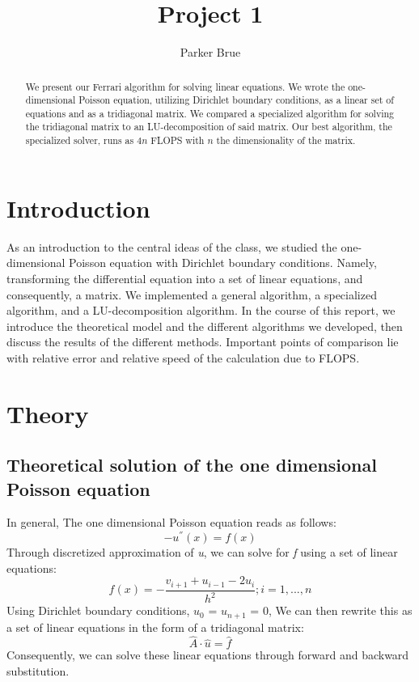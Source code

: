 \documentclass[10pt,showpacs,preprintnumbers,footinbib,amsmath,amssymb,aps,prl,twocolumn,groupedaddress,superscriptaddress,showkeys]{revtex4-1}
\begin{document}
\title{Project 1}
\author{Parker Brue}
\begin{abstract}
We present our Ferrari algorithm for solving linear equations. We wrote the one-dimensional Poisson equation, utilizing Dirichlet boundary conditions, as a linear set of equations and as a tridiagonal matrix. We compared a specialized algorithm for solving the tridiagonal matrix to an LU-decomposition of said matrix.  Our best algorithm, the specialized solver, runs as $4n$ FLOPS with $n$ the dimensionality of the matrix.
\end{abstract}
\maketitle

\section{Introduction}
As an introduction to the central ideas of the class, we studied the one-dimensional Poisson equation with Dirichlet boundary conditions. Namely, transforming the differential equation into a set of linear equations, and consequently, a matrix. We implemented a general algorithm, a specialized algorithm, and a LU-decomposition algorithm. In the course of this report, we introduce the theoretical model and the different algorithms  we developed, then discuss the results of the different methods. Important points of comparison lie with relative error and relative speed of the calculation due to FLOPS. 

\section{Theory}
	\subsection{Theoretical solution of the one dimensional Poisson equation}	
In general, The one dimensional Poisson equation reads as follows: \begin{equation} -u^{''}(x) = f(x)     \end{equation}  Through discretized approximation of {\it u}, we can solve for {\it f} using a set of linear equations: \begin{equation}
	f(x)=-\frac{v_{i+1}+u_{i-1}-2u_{i}}{h^{2}}      ;      i=1,...,n
	\end{equation}
Using Dirichlet boundary conditions, $u_{0}$  = $u_{n+1}$ = 0,  We can then rewrite this as a set of linear equations in the form of a tridiagonal matrix: \begin{equation}	
	\hat{A} \cdot \hat{u} = \hat{f}
	\end{equation}
Consequently, we can solve these linear equations through forward and backward substitution.
\end{document}
